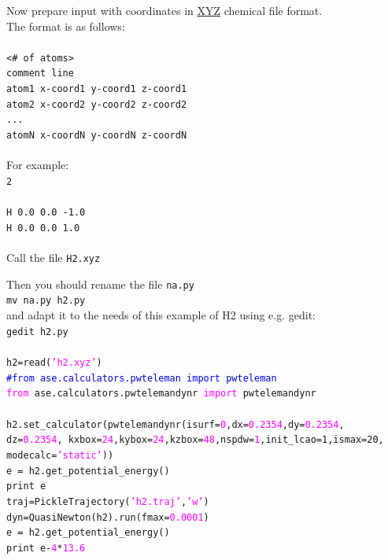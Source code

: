 \documentclass[10pt]{beamer}
\begin{document}
\begin{frame}
Now prepare input with coordinates in \href{http://openbabel.org/wiki/XYZ\_(format)}{XYZ} chemical file format.\\
The format is as follows:\\
~\\
{\tt <# of atoms>\\
comment line\\
atom1 x-coord1 y-coord1 z-coord1\\
atom2 x-coord2 y-coord2 z-coord2\\
...\\
atomN x-coordN y-coordN z-coordN}\\
~\\
For example:\\
{\tt 2\\
~~\\
H	0.0	0.0	-1.0\\
H	0.0	0.0	1.0\\}
~\\
Call the file {\tt H2.xyz}
\end{frame}





\begin{frame}
Then you should rename the file {\tt na.py}\\
{\tt mv na.py h2.py}\\
and adapt it to the needs of this example of H2 using e.g. gedit:\\
{\tt gedit h2.py}\\
~\\
\small{{\tt h2=read(\textcolor{magenta}{'h2.xyz'})\\
\textcolor{blue}{#from ase.calculators.pwteleman import pwteleman}\\
\textcolor{magenta}{from} ase.calculators.pwtelemandynr \textcolor{magenta}{import} pwtelemandynr\\
~\\
h2.set\_calculator(pwtelemandynr(isurf=\textcolor{magenta}{0},dx=\textcolor{magenta}{0.2354},dy=\textcolor{magenta}{0.2354},\\dz=\textcolor{magenta}{0.2354},
kxbox=\textcolor{magenta}{24},kybox=\textcolor{magenta}{24},kzbox=\textcolor{magenta}{48},nspdw=\textcolor{magenta}{1},init\_lcao=1,ismax=20,\\ modecalc=\textcolor{magenta}{'static'}))\\
e = h2.get\_potential\_energy()\\
print e\\
traj=PickleTrajectory(\textcolor{magenta}{'h2.traj'},\textcolor{magenta}{'w'})\\
dyn=QuasiNewton(h2).run(fmax=\textcolor{magenta}{0.0001})\\
e = h2.get\_potential\_energy()\\
print e-\textcolor{magenta}{4}*\textcolor{magenta}{13.6}}}
\end{frame}
\end{document}
